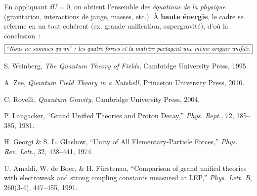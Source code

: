 \documentclass[12pt]{article}
\begin{document}
En appliquant \(\delta U=0\), on obtient l'ensemble des \emph{\'equations de la physique} 
(gravitation, interactions de jauge, masses, etc.). \`A \textbf{haute \'energie}, 
le cadre se referme en un tout coh\'erent (ex. grande unification, supergravité), 
d'o\`u la conclusion~: 
\[
\boxed{\text{\it ``Nous ne sommes qu'un'' : les quatre forces et la mati\`ere partagent une m\^eme origine unifi\'ee.}}
\]

\vspace{1em}

\begin{thebibliography}{9}

S. Weinberg, 
\textit{The Quantum Theory of Fields}, 
Cambridge University Press, 1995.

A. Zee,
\textit{Quantum Field Theory in a Nutshell},
Princeton University Press, 2010.

C. Rovelli, 
\textit{Quantum Gravity}, 
Cambridge University Press, 2004.

P. Langacker,
``Grand Unified Theories and Proton Decay,''
\textit{Phys. Rept.}, 72, 185--385, 1981.

H. Georgi \& S. L. Glashow,
``Unity of All Elementary-Particle Forces,''
\textit{Phys. Rev. Lett.}, 32, 438--441, 1974.

U. Amaldi, W. de Boer, \& H. F\"urstenau,
``Comparison of grand unified theories with electroweak and strong coupling constants measured at LEP,''
\textit{Phys. Lett. B}, 260(3-4), 447--455, 1991.

\end{thebibliography}
\end{document}
